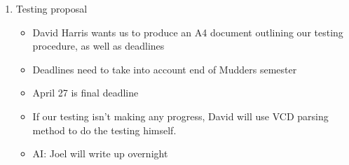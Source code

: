\documentclass{article}
\begin{document}
\begin{flushleft}
\begin{enumerate}
  \item Testing proposal
    \begin{itemize}
     \item David Harris wants us to produce an A4 document outlining
           our testing procedure, as well as deadlines
     \item Deadlines need to take into account end of Mudders semester
     \item April 27 is final deadline
     \item If our testing isn't making any progress, David will
           use VCD parsing method to do the testing himself.
     \item AI: Joel will write up overnight
   \end{itemize}

\end{enumerate}

\end{flushleft}
\end{document}
